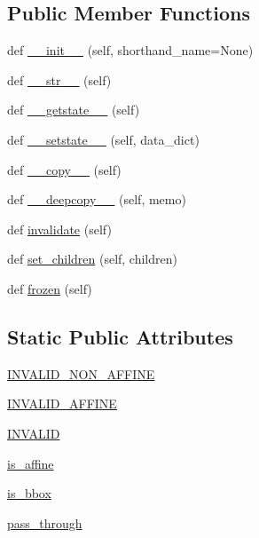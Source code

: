 \subsection*{Public Member Functions}
\begin{DoxyCompactItemize}
\item 
def \hyperlink{classmatplotlib_1_1transforms_1_1TransformNode_ad4ffeea20a242e470bba379e7f0c9cb7}{\+\_\+\+\_\+init\+\_\+\+\_\+} (self, shorthand\+\_\+name=None)
\item 
def \hyperlink{classmatplotlib_1_1transforms_1_1TransformNode_aa6858e8f223461629fac0b43cd3c14a9}{\+\_\+\+\_\+str\+\_\+\+\_\+} (self)
\item 
def \hyperlink{classmatplotlib_1_1transforms_1_1TransformNode_ad72105c25f5f6dcf148bb264b50a2721}{\+\_\+\+\_\+getstate\+\_\+\+\_\+} (self)
\item 
def \hyperlink{classmatplotlib_1_1transforms_1_1TransformNode_aef9fd3cf7eacacc06719488bc6ce667b}{\+\_\+\+\_\+setstate\+\_\+\+\_\+} (self, data\+\_\+dict)
\item 
def \hyperlink{classmatplotlib_1_1transforms_1_1TransformNode_ab16afb5e1d976fa5604f8e72b49730ef}{\+\_\+\+\_\+copy\+\_\+\+\_\+} (self)
\item 
def \hyperlink{classmatplotlib_1_1transforms_1_1TransformNode_a359589c058e3567d7c47cffa4e607753}{\+\_\+\+\_\+deepcopy\+\_\+\+\_\+} (self, memo)
\item 
def \hyperlink{classmatplotlib_1_1transforms_1_1TransformNode_ae1544e935b8b0a669c853b203c23f7a3}{invalidate} (self)
\item 
def \hyperlink{classmatplotlib_1_1transforms_1_1TransformNode_a63457ed969d643c0716d892944ac808b}{set\+\_\+children} (self, children)
\item 
def \hyperlink{classmatplotlib_1_1transforms_1_1TransformNode_a4cca47dab4b9166db56368c471175909}{frozen} (self)
\end{DoxyCompactItemize}
\subsection*{Static Public Attributes}
\begin{DoxyCompactItemize}
\item 
\hyperlink{classmatplotlib_1_1transforms_1_1TransformNode_a7537629a8c01feeed15e332f6945a738}{I\+N\+V\+A\+L\+I\+D\+\_\+\+N\+O\+N\+\_\+\+A\+F\+F\+I\+NE}
\item 
\hyperlink{classmatplotlib_1_1transforms_1_1TransformNode_a4bd6f9f180aa2a7cc845a57c7e01bf50}{I\+N\+V\+A\+L\+I\+D\+\_\+\+A\+F\+F\+I\+NE}
\item 
\hyperlink{classmatplotlib_1_1transforms_1_1TransformNode_accd5660807dd45594449717bd1836d45}{I\+N\+V\+A\+L\+ID}
\item 
\hyperlink{classmatplotlib_1_1transforms_1_1TransformNode_a2f370925a5e006ed8760a9c71ec04e4b}{is\+\_\+affine}
\item 
\hyperlink{classmatplotlib_1_1transforms_1_1TransformNode_a2b630eb822ac826fd06aec6b87d92947}{is\+\_\+bbox}
\item 
\hyperlink{classmatplotlib_1_1transforms_1_1TransformNode_a18c8b6a43ab4769ff18d337994e96893}{pass\+\_\+through}
\end{DoxyCompactItemize}



